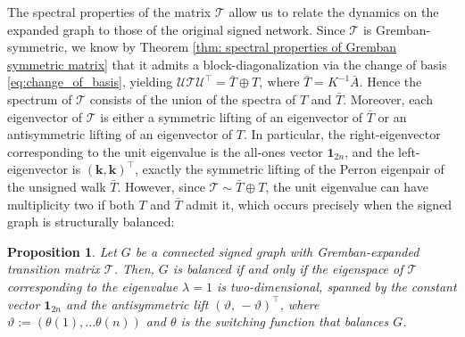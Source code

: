 \documentclass[reprint,onecolumn]{article}
\newtheorem{proposition}[theorem]{Proposition}
\newcommand{\mc}[1]{\mathcal{#1}}
\newcommand{\1}{\mathbb{1}}
\newcommand{\0}{\mathbf{0}}
\begin{document}
The spectral properties of the matrix $\mathcal{T}$ allow us to relate the dynamics on the expanded graph to those of the original signed network. Since $\mathcal{T}$ is Gremban-symmetric, we know by Theorem \ref{thm: spectral properties of Gremban symmetric matrix} that it admits a block-diagonalization via the change of basis \eqref{eq:change_of_basis}, yielding
\(
\mc U \mc T \mc U^\top = \bar T \oplus T, \ \text{where } \bar T = K^{-1} \bar A.
\)
 Hence the spectrum of \( \mc T \) consists of the union of the spectra of $T$ and $\bar T$. Moreover, each eigenvector of \( \mc T \) is either a symmetric lifting of an eigenvector of \( \bar T \) or an antisymmetric lifting of an eigenvector of \( T \). In particular, the right-eigenvector corresponding to the unit eigenvalue is the all-ones vector $\mathbf{1}_{2n}$, and the left-eigenvector is $(\mathbf{k},\mathbf{k})^\top$, exactly the symmetric lifting of the Perron eigenpair of the unsigned walk $\bar T$. However, since $\mc T \sim \bar T \oplus T$, the unit eigenvalue can have multiplicity two if both $T$ and $\bar T$ admit it, which occurs precisely when the signed graph is structurally balanced:

\begin{proposition}
Let $G$ be a connected signed graph with Gremban-expanded transition matrix $\mc T$. Then, $G$ is balanced if and only if the eigenspace of $\mc T$ corresponding to the eigenvalue $\lambda=1$ is two-dimensional, spanned by the constant vector $\mathbf1_{2n}$ and the antisymmetric lift $(\vartheta,\,-\vartheta)^\top$, where $\vartheta:=(\theta(1),...\theta(n))$ and $\theta$ is the switching function that balances $G$. 
\end{proposition}
\end{document}
